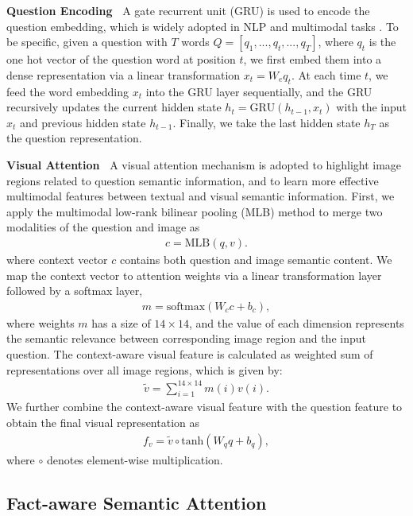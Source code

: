 \documentclass[sigconf]{acmart}
\begin{document}
\textbf{Question Encoding~} A gate recurrent unit (GRU) \cite{cho2014learning} is used to encode the question embedding, which is widely adopted in NLP and multimodal tasks \cite{long2017cognition,li2017context,yu2017multi}. To be specific, given a question with $T$ words $Q = [q_1,...,q_t,...,q_T]$, where $q_t$ is the one hot vector of the question word at position $t$, we first embed them into a dense representation via a linear transformation $x_t = W_eq_t$. At each time $t$, we feed the word embedding $x_t$ into the GRU layer sequentially, and the GRU recursively updates the current hidden state $h_t = \mathrm{GRU}(h_{t-1},x_t)$ with the input $x_t$ and previous hidden state $h_{t-1}$. Finally, we take the last hidden state $h_T$ as the question representation.


\textbf{Visual Attention~} A visual attention mechanism is adopted to highlight image regions related to question semantic information, and to learn more effective multimodal features between textual and visual semantic information. First, we apply the multimodal low-rank bilinear pooling (MLB) method \cite{kim2016hadamard} to merge two modalities of the question and image as
\begin{align}
	c = \mathrm{MLB}(q, v) .
\end{align}
where context vector $c$ contains both question and image semantic content.
We map the  context vector to attention weights via a linear transformation layer followed by a softmax layer, 
\begin{align}
m = \mathrm{softmax}(W_c c +b_c) ,
\end{align}
where weights $m$ has a size of $14\times14$, and the value of each dimension represents the semantic relevance between corresponding image region and the input question. The context-aware visual feature is calculated as weighted sum of representations over all image regions, which is given by:
\begin{align}
	\tilde{v} =\sum_{i=1}^{14\times14} m(i) v(i) .
\end{align}
We further combine the context-aware visual feature with the question feature to obtain the final visual representation as
\begin{align}
	f_v = \tilde{v} \circ \mathrm{tanh}(W_q q +b_q), 
\end{align}
where $\circ$ denotes element-wise multiplication.


\subsection{Fact-aware Semantic Attention}\label{subsection:52}
\end{document}

